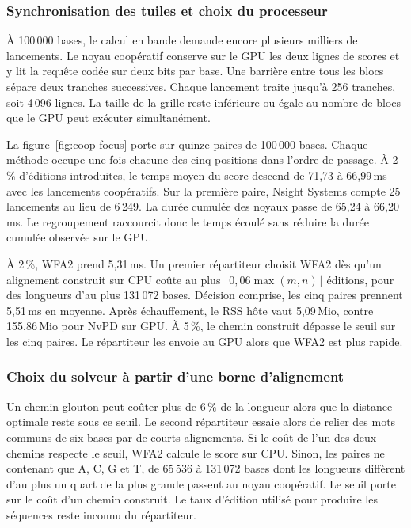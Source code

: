 \subsubsection{Synchronisation des tuiles et choix du processeur}\label{sec:lancements-cooperatifs}
À 100\,000 bases, le calcul en bande demande encore plusieurs milliers de lancements. Le noyau coopératif conserve sur le GPU les deux lignes de scores et y lit la requête codée sur deux bits par base. Une barrière entre tous les blocs sépare deux tranches successives. Chaque lancement traite jusqu’à 256 tranches, soit 4\,096 lignes. La taille de la grille reste inférieure ou égale au nombre de blocs que le GPU peut exécuter simultanément.

La figure~\ref{fig:coop-focus} porte sur quinze paires de 100\,000 bases. Chaque méthode occupe une fois chacune des cinq positions dans l’ordre de passage. À 2\,\% d’éditions introduites, le temps moyen du score descend de 71,73 à 66,99\,ms avec les lancements coopératifs. Sur la première paire, Nsight Systems compte 25 lancements au lieu de 6\,249. La durée cumulée des noyaux passe de 65,24 à 66,20\,ms. Le regroupement raccourcit donc le temps écoulé sans réduire la durée cumulée observée sur le GPU.

À 2\,\%, WFA2 prend 5,31\,ms. Un premier répartiteur choisit WFA2 dès qu’un alignement construit sur CPU coûte au plus \(\lfloor0{,}06\max(m,n)\rfloor\) éditions, pour des longueurs d’au plus 131\,072 bases. Décision comprise, les cinq paires prennent 5,51\,ms en moyenne. Après échauffement, le RSS hôte vaut 5,09\,Mio, contre 155,86\,Mio pour NvPD sur GPU. À 5\,\%, le chemin construit dépasse le seuil sur les cinq paires. Le répartiteur les envoie au GPU alors que WFA2 est plus rapide.


\subsubsection{Choix du solveur à partir d’une borne d’alignement}
Un chemin glouton peut coûter plus de 6\,\% de la longueur alors que la distance optimale reste sous ce seuil. Le second répartiteur essaie alors de relier des mots communs de six bases par de courts alignements. Si le coût de l’un des deux chemins respecte le seuil, WFA2 calcule le score sur CPU. Sinon, les paires ne contenant que A, C, G et T, de 65\,536 à 131\,072 bases dont les longueurs diffèrent d’au plus un quart de la plus grande passent au noyau coopératif. Le seuil porte sur le coût d’un chemin construit. Le taux d’édition utilisé pour produire les séquences reste inconnu du répartiteur.

